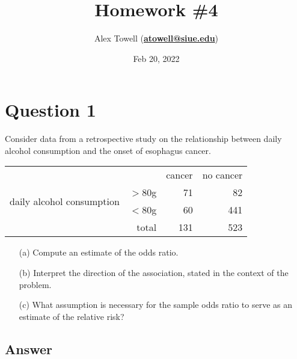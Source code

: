 \documentclass[10pt]{fphw}
\title{Homework \#4} %
\author{Alex Towell (\href{mailto:atowell@siue.edu}{\bfseries{atowell@siue.edu}})}
\date{Feb 20, 2022} %
\institute{Southern Illinois University-Edwardsville}
\begin{document}
\maketitle %

\section*{Question 1}
Consider data from a retrospective study on the relationship between daily alcohol consumption and the
onset of esophagus cancer.

\begin{table}[h]
\centering
\begin{tabular}{@{}rrrr@{}}
\toprule
                                            &           & cancer&no cancer\\
\cmidrule{3-4}
\multirow{2}{*}{daily alcohol consumption}  & $> 80$g  	& 71    & 82\\
                                            & $< 80$g 	& 60    & 441\\
                                            & total     & 131   & 523\\
\bottomrule
\end{tabular}
\end{table}

\begin{enumerate}
\item[(a)] Compute an estimate of the odds ratio.
\item[(b)] Interpret the direction of the association, stated in the context of the problem.
\item[(c)] What assumption is necessary for the sample odds ratio to serve as an estimate of the relative risk?
\end{enumerate}  
\subsection*{Answer}
\end{document}
